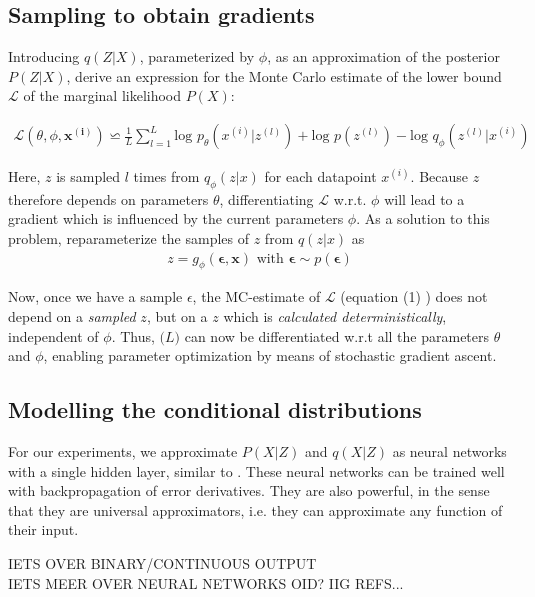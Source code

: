 \documentclass{article}
\begin{document}
\subsection{Sampling to obtain gradients}

Introducing $q(Z|X)$, parameterized by $\phi$, as an approximation of the posterior $P(Z|X)$, \cite{kingma2013auto} derive an expression for the Monte Carlo estimate of the lower bound $\mathcal{L}$ of the marginal likelihood $P(X)$:

\begin{align}
\mathcal{L}(\theta ,\phi ,  \mathbf{x^{(i)}}) \backsimeq \frac{1}{L} \sum_{l=1}^{L} \text{log } p_{\theta} (x^{(i)}|z^{(l)})+ \text{log }p(z^{(l)}	)-\text{log }q_{\phi}(z^{(l)}|x^{(i)})
\end{align}

Here, $z$ is sampled $l$ times from $q_{\phi}(z|x)$ for each datapoint $x^{(i)}$. Because $z$ therefore depends on parameters $\theta$, differentiating $\mathcal{L}$ w.r.t. $\phi$ will lead to a gradient which is influenced by the current parameters $\phi$. 
As a solution to this problem, \cite{kingma2013auto} reparameterize the samples of $z$ from $q(z|x)$ as
\begin{align}
z = g_\phi(\mathbf{\epsilon},\mathbf{x}) \text{  with  } \mathbf{\epsilon} \sim p(\mathbf{\epsilon}) 
\end{align} 

Now, once we have a sample $\epsilon$, the MC-estimate of $\mathcal{L}$ (equation (1) ) does not depend on a \textit{sampled} $z$, but on a  $z$ which is \textit{calculated deterministically}, independent of $\phi$. Thus, $\mathcal(L)$ can now be differentiated w.r.t all the parameters $\theta$ and $\phi$, enabling parameter optimization by means of stochastic gradient ascent.

\subsection{Modelling the conditional distributions}

For our experiments, we approximate $P(X|Z)$ and $q(X|Z)$ as neural networks with a single hidden layer, similar to \cite{kingma2013auto}. These neural networks can be trained well with backpropagation of error derivatives. They are also powerful, in the sense that they are universal approximators, i.e. they can approximate any function of their input. 

IETS OVER BINARY/CONTINUOUS OUTPUT \\
IETS MEER OVER NEURAL NETWORKS OID? IIG REFS...
\end{document}
